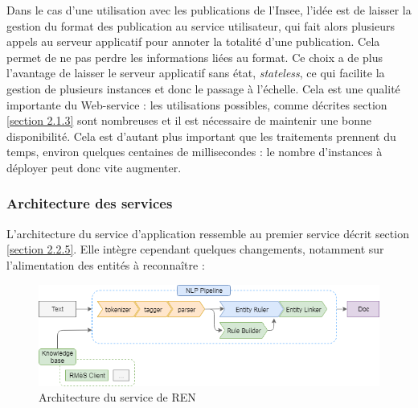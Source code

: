 Dans le cas d'une utilisation avec les publications de l'Insee, l'idée est de laisser la gestion du format des publication au service utilisateur, qui fait alors plusieurs appels au serveur applicatif pour annoter la totalité d'une publication. Cela permet de ne pas perdre les informations liées au format. Ce choix a de plus l'avantage de laisser le serveur applicatif sans état, \textit{stateless}, ce qui facilite la gestion de plusieurs instances et donc le passage à l'échelle. Cela est une qualité importante du Web-service : les utilisations possibles, comme décrites section \ref{section 2.1.3} sont nombreuses et il est nécessaire de maintenir une bonne disponibilité. Cela est d'autant plus important que les traitements prennent du temps, environ quelques centaines de millisecondes : le nombre d'instances à déployer peut donc vite augmenter. 
\newline
\label{section 3.2.1}

\subsubsection*{Architecture des services}
L'architecture du service d'application ressemble au premier service décrit section \ref{section 2.2.5}. Elle intègre cependant quelques changements, notamment sur l'alimentation des entités à reconnaître :
\vspace{10pt}
\begin{figure}[H]
    \centering
    \includegraphics[scale=0.7]{images/InspaCy-archi.png}
    \caption{Architecture du service de REN}
    \label{fig:inspacy-archi}
\end{figure}
\vspace{10pt}

